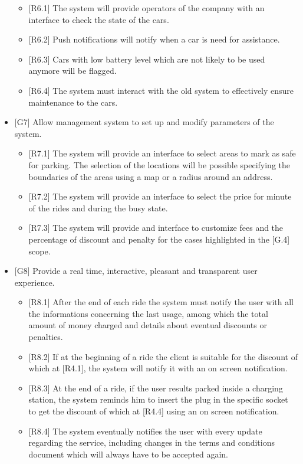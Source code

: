 \documentclass[]{article}
\providecommand{\tightlist}{%
  \setlength{\itemsep}{0pt}\setlength{\parskip}{0pt}}
\begin{document}
\begin{itemize}
  \begin{itemize}
  \tightlist
  \item
    {[}R6.1{]} The system will provide operators of the company with an
    interface to check the state of the cars.
  \item
    {[}R6.2{]} Push notifications will notify when a car is need for
    assistance.
  \item
    {[}R6.3{]} Cars with low battery level which are not likely to be
    used anymore will be flagged.
  \item
    {[}R6.4{]} The system must interact with the old system to
    effectively ensure maintenance to the cars.
  \end{itemize}
\item
  {[}G7{]} Allow management system to set up and modify parameters of
  the system.

  \begin{itemize}
  \tightlist
  \item
    {[}R7.1{]} The system will provide an interface to select areas to
    mark as safe for parking. The selection of the locations will be
    possible specifying the boundaries of the areas using a map or a
    radius around an address.
  \item
    {[}R7.2{]} The system will provide an interface to select the price
    for minute of the rides and during the busy state.
  \item
    {[}R7.3{]} The system will provide and interface to customize fees
    and the percentage of discount and penalty for the cases highlighted
    in the {[}G.4{]} scope.
  \end{itemize}
\item
  {[}G8{]} Provide a real time, interactive, pleasant and transparent
  user experience.

  \begin{itemize}
  \tightlist
  \item
    {[}R8.1{]} After the end of each ride the system must notify the
    user with all the informations concerning the last usage, among
    which the total amount of money charged and details about eventual
    discounts or penalties.
  \item
    {[}R8.2{]} If at the beginning of a ride the client is suitable for
    the discount of which at {[}R4.1{]}, the system will notify it with
    an on screen notification.
  \item
    {[}R8.3{]} At the end of a ride, if the user results parked inside a
    charging station, the system reminds him to insert the plug in the
    specific socket to get the discount of which at {[}R4.4{]} using an
    on screen notification.
  \item
    {[}R8.4{]} The system eventually notifies the user with every update
    regarding the service, including changes in the terms and conditions
    document which will always have to be accepted again.
  \end{itemize}
\end{itemize}
\end{document}
